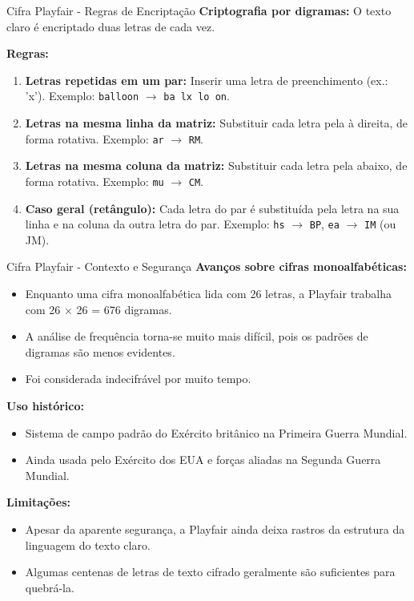 \begin{frame}{Cifra Playfair - Regras de Encriptação}
    \textbf{Criptografia por digramas:} O texto claro é encriptado duas letras de cada vez.

    \medskip
    \textbf{Regras:}
    \begin{enumerate}
        \item \textbf{Letras repetidas em um par:} Inserir uma letra de preenchimento (ex.: 'x').
              Exemplo: \texttt{balloon} $\rightarrow$ \texttt{ba lx lo on}.

        \item \textbf{Letras na mesma linha da matriz:} Substituir cada letra pela à direita, de forma rotativa.
              Exemplo: \texttt{ar} $\rightarrow$ \texttt{RM}.

        \item \textbf{Letras na mesma coluna da matriz:} Substituir cada letra pela abaixo, de forma rotativa.
              Exemplo: \texttt{mu} $\rightarrow$ \texttt{CM}.

        \item \textbf{Caso geral (retângulo):} Cada letra do par é substituída pela letra na sua linha e na coluna da outra letra do par.
              Exemplo: \texttt{hs} $\rightarrow$ \texttt{BP}, \texttt{ea} $\rightarrow$ \texttt{IM} (ou JM).
    \end{enumerate}
\end{frame}

\begin{frame}{Cifra Playfair - Contexto e Segurança}
    \textbf{Avanços sobre cifras monoalfabéticas:}
    \begin{itemize}
        \item Enquanto uma cifra monoalfabética lida com 26 letras, a Playfair trabalha com 26 × 26 = 676 digramas.
        \item A análise de frequência torna-se muito mais difícil, pois os padrões de digramas são menos evidentes.
        \item Foi considerada indecifrável por muito tempo.
    \end{itemize}

    \textbf{Uso histórico:}
    \begin{itemize}
        \item Sistema de campo padrão do Exército britânico na Primeira Guerra Mundial.
        \item Ainda usada pelo Exército dos EUA e forças aliadas na Segunda Guerra Mundial.
    \end{itemize}

    \textbf{Limitações:}
    \begin{itemize}
        \item Apesar da aparente segurança, a Playfair ainda deixa rastros da estrutura da linguagem do texto claro.
        \item Algumas centenas de letras de texto cifrado geralmente são suficientes para quebrá-la.
    \end{itemize}
\end{frame}


